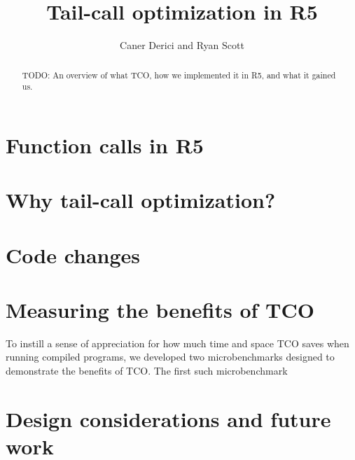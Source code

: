 \documentclass[12pt]{article}
\begin{document}
 
\title{Tail-call optimization in R5\vspace{-2ex}}
\author{Caner Derici and Ryan Scott} 
 
\maketitle

\begin{abstract}
 TODO: An overview of what TCO, how we implemented it in R5, and what it gained us.
\end{abstract}

\section{Function calls in R5}

\section{Why tail-call optimization?}

\section{Code changes}

\section{Measuring the benefits of TCO}

To instill a sense of appreciation for how much time and space TCO saves when running
compiled programs, we developed two microbenchmarks designed to demonstrate the benefits
of TCO. The first such microbenchmark 

\section{Design considerations and future work}
\end{document}
